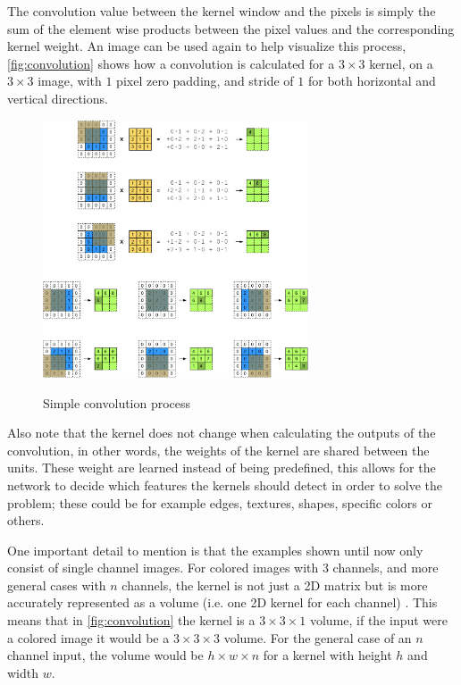The convolution value between the kernel window and the pixels is simply the sum of the element wise products between the pixel values and the corresponding kernel weight. An image can be used again to help visualize this process, \autoref{fig:convolution} shows how a convolution is calculated for a $3\times3$ kernel, on a $3\times3$ image, with $1$ pixel zero padding, and stride of $1$ for both horizontal and vertical directions.
\begin{figure}[hbt]
    \centering
    \caption{Simple convolution process}
    \includegraphics[width=0.7\textwidth]{chapters/NeuralNets/figures/convolution.pdf}
    \label{fig:convolution}
\end{figure}

Also note that the kernel does not change when calculating the outputs of the convolution, in other words, the weights of the kernel are shared between the units. These weight are learned instead of being predefined, this allows for the network to decide which features the kernels should detect in order to solve the problem; these could be for example edges, textures, shapes, specific colors or others.

One important detail to mention is that the examples shown until now only consist of single channel images. For colored images with 3 channels, and more general cases with $n$ channels, the kernel is not just a 2D matrix but is more accurately represented as a volume (i.e. one 2D kernel for each channel) . This means that in \autoref{fig:convolution} the kernel is a $3\times3\times1$ volume, if the input were a colored image it would be a $3\times3\times3$ volume. For the general case of an $n$ channel input, the volume would be $h\times w\times n$ for a kernel with height $h$ and width $w$.

